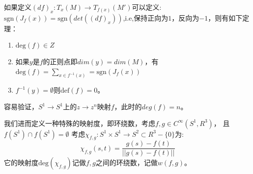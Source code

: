 \documentclass[supercite]{HustGraduPaper}
\begin{document}
\begin{appendices}
		如果定义$(df)_x: T_x(M)\to T_{f(x)}(M')$可以定义: $\text{sgn}(J_f(x)) = \text{sgn}(det((df)_x))$,i.e,保持正向为$1$，反向为$-1$，则有如下定理：
		\begin{enumerate}
			\item $\text{deg}(f) \in Z$
			\item 如果$y$是$f$的正则点即$dim(y) = dim(M)$，有$\text{deg}(f) = \sum_{x \in f^{-1}(x)} = \text{sgn}(J_f(x))$
			\item $f^{-1}(y) = \emptyset$则$\text{def}(f) = 0$。
		\end{enumerate}
		
		容易验证，$S^1 \to S^1$上的$z \to z^n$映射$f$，此时的$deg(f) = n$。
		
		我们进而定义一种特殊的映射度，即环绕数，考虑$f,g \in C^{\infty}(S^1,R^3)$， 且$f(S^1) \cap f(S^1) = \emptyset$ 考虑$\chi_{f,g}: S^1 \times S^1 \to S^2 \subset R^3 - \{0\} $为:
		\begin{equation}
		\chi_{f,g}(s,t) = \frac{g(s) - f(t)}{||g(s)-f(t)||}
		\end{equation}
		它的映射度$\text{deg}(\chi_{f,g})$记做$f,g$之间的环绕数，记做$w(f,g)$。
		
	\end{appendices}
	
\end{document}
